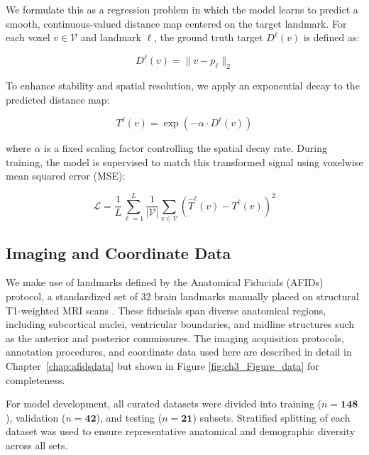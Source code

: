 We formulate this as a regression problem in which the model learns to predict a smooth, continuous-valued distance map centered on the target landmark. For each voxel $v \in \mathcal{V}$ and landmark $\ell$, the ground truth target $D^\ell(v)$ is defined as:

\begin{equation}
D^\ell(v) = \lVert v - p_\ell \rVert_2
\end{equation}

To enhance stability and spatial resolution, we apply an exponential decay to the predicted distance map:

\begin{equation}
T^\ell(v) = \exp(-\alpha \cdot D^\ell(v))
\end{equation}

where $\alpha$ is a fixed scaling factor controlling the spatial decay rate. During training, the model is supervised to match this transformed signal using voxelwise mean squared error (MSE):

\begin{equation}
\mathcal{L} = \frac{1}{L} \sum_{\ell=1}^L \frac{1}{|\mathcal{V}|} \sum_{v \in \mathcal{V}} \left( \hat{T}^\ell(v) - T^\ell(v) \right)^2
\end{equation}

\subsection{Imaging and Coordinate Data}

We make use of landmarks defined by the Anatomical Fiducials (AFIDs) protocol, a standardized set of 32 brain landmarks manually placed on structural T1-weighted MRI scans \cite{Lau2019-eh}. These fiducials span diverse anatomical regions, including subcortical nuclei, ventricular boundaries, and midline structures such as the anterior and posterior commissures. The imaging acquisition protocols, annotation procedures, and coordinate data used here are described in detail in Chapter~\ref{chap:afidsdata} but shown in Figure \ref{fig:ch3_Figure_data} for completeness.

For model development, all curated datasets were divided into training ($n = \textbf{148}$), validation ($n = \textbf{42}$), and testing ($n = \textbf{21}$) subsets. Stratified splitting of each dataset was used to ensure representative anatomical and demographic diversity across all sets.

